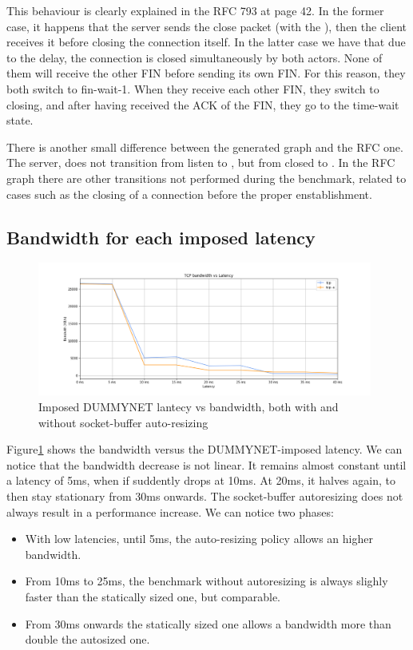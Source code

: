 \documentclass[a4paper,10pt]{article}
\begin{document}
This behaviour is clearly explained in the RFC 793\cite{RFC_793} at page 42. In the former case, it happens that the server sends the close packet (with the ), then the client receives it before closing the connection itself.
In the latter case we have that due to the delay, the connection is closed simultaneously by both actors. None of them will receive the other FIN before sending its own FIN. For this reason, they both switch to fin-wait-1. When they receive each other FIN, they switch to closing, and after having received the ACK of the FIN, they go to the time-wait state.

There is another small difference between the generated graph and the RFC one. The server, does not transition from listen to , but from closed to . In the RFC graph there are other transitions not performed during the benchmark, related to cases such as the closing of a connection before the proper enstablishment.



\subsection{Bandwidth for each imposed latency}

\begin{figure}[h]
\centering
\includegraphics[width=11cm]{images/tcp_bandwidth.png}
  \caption{Imposed DUMMYNET lantecy vs bandwidth, both with and without socket-buffer auto-resizing}
   \label{fig:bandwidth}
\end{figure}

Figure\ref{fig:bandwidth} shows the bandwidth versus the DUMMYNET-imposed latency. We can notice that the bandwidth decrease is not linear. It remains almost constant until a latency of 5ms, when if suddently drops at 10ms. At 20ms, it halves again, to then stay stationary from 30ms onwards.
The socket-buffer autoresizing does not always result in a performance increase. We can notice two phases:
\begin{itemize}
   \item With low latencies, until 5ms, the auto-resizing policy allows an higher bandwidth.
   \item From 10ms to 25ms, the benchmark without autoresizing is always slighly faster than the statically sized one, but comparable.
   \item From 30ms onwards the statically sized one allows a bandwidth more than double the autosized one. %
\end{itemize}
\end{document}
